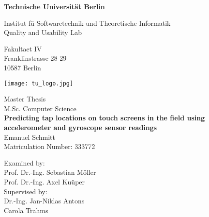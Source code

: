 \thispagestyle{empty}
\begin{center}

\vspace*{0.3cm}
{\LARGE \textbf{Technische Universit{\"a}t Berlin}}

\vspace{0.3cm}

{\large Institut f{\"u} Softwaretechnik und Theoretische Informatik\\[1mm]}
{\large Quality and Usability Lab\\[5mm]}

Fakultaet IV\\
Franklinstrasse 28-29\\
10587 Berlin\\

\vspace*{1cm}

\texttt{[image: tu\_logo.jpg]}

\vspace*{1.0cm}

{\LARGE Master Thesis}\\
\vspace{0.3cm}
{\large M.Sc. Computer Science}\\

\vspace{0.8cm}
{\LARGE \textbf{Predicting tap locations on touch screens in the field using accelerometer and gyroscope sensor readings}}\\
\vspace*{0.8cm}
{\LARGE Emanuel Schmitt}
\\
\vspace*{0.5cm}
Matriculation Number: 333772\\
\vspace*{1.0cm}

Examined by:\\
Prof. Dr.-Ing. Sebastian M{\"o}ller\\
Prof. Dr.-Ing. Axel Ku{\"u}per\\
\vspace*{0.3cm}
Supervised by:\\
Dr.-Ing. Jan-Niklas Antons\\
Carola Trahms
\vspace{3cm}


\end{center}

